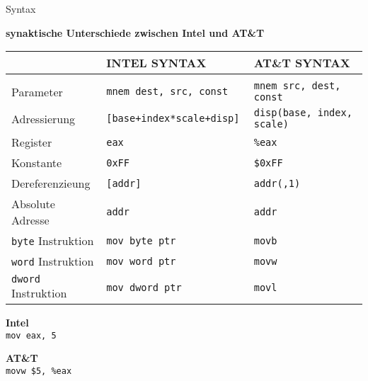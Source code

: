 \begin{frame}{Syntax}
  \begin{center}
  \textbf{synaktische Unterschiede zwischen Intel und AT\&T}
  \end{center}

  \begin{small}
  \begin{table}[h]  %
  \begin{tabular}{lll}
  \\                            & INTEL SYNTAX                  & AT\&T SYNTAX
  \\\hline
  \\  Parameter                 & \tt mnem dest, src, const     & \tt mnem src, dest, const
  \\  Adressierung              & \tt [base+index*scale+disp]   & \tt disp(base, index, scale)
  \\  Register                  & \tt eax                       & \tt \%eax
  \\  Konstante                 & \tt 0xFF                      & \tt \$0xFF
  \\  Dereferenzieung           & \tt [addr]                    & \tt addr(,1)
  \\  Absolute Adresse          & \tt addr                      & \tt *addr
  \\  {\tt byte} Instruktion    & \tt mov byte ptr              & \tt movb
  \\  {\tt word} Instruktion    & \tt mov word ptr              & \tt movw
  \\  {\tt dword} Instruktion   & \tt mov dword ptr             & \tt movl
  \end{tabular}
  \end{table}
  \end{small}

  \begin{multicols}{2}
    \begin{minipage}{5cm}
      \begin{center}
      \textbf{Intel}\\
        \texttt{mov    eax, 5}
      \end{center}
    \end{minipage}

    \begin{minipage}{5cm}
      \begin{center}
      \textbf{AT\&T}\\
        \texttt{movw   \$5, \%eax}
      \end{center}
    \end{minipage}
  \end{multicols}

\end{frame}
